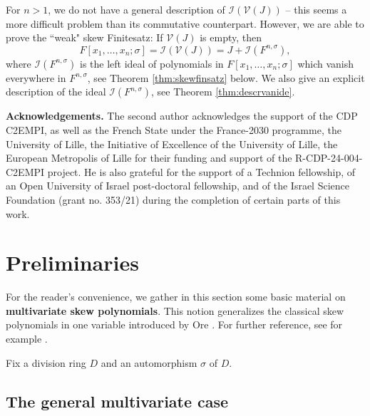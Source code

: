 \documentclass[11pt,reqno]{amsart}
\theoremstyle{definition}
\begin{document}
For $n > 1$, we do not have a general description of $\mathscr{I}(\mathscr{V}(J))$ -- this seems a more difficult problem than its commutative counterpart. However, we are able to prove the ``weak" skew Finitesatz: If $\mathscr{V}(J)$ is empty, then $$F[x_1,\dots,x_n;\sigma]=\mathscr{I}(\mathscr{V}(J))=J+\mathscr{I}(F^{n,\sigma}),$$
where $\mathscr{I}(F^{n,\sigma})$ is the left ideal of polynomials in $F[x_1,\ldots,x_n;\sigma]$ which vanish everywhere in $F^{n,\sigma}$, see Theorem \ref{thm:skewfinsatz} below. We also give an explicit description of the ideal $\mathscr{I}(F^{n,\sigma})$, see Theorem \ref{thm:descrvanide}. 


{\bf Acknowledgements.} The second author acknowledges the support of the CDP C2EMPI, as well as the French State under the France-2030 programme, the University of Lille, the Initiative of Excellence of the University of Lille, the European Metropolis of Lille for their funding and support of the R-CDP-24-004-C2EMPI project. He is also grateful for the support of a Technion fellowship, of an Open University of
Israel post-doctoral fellowship, and of the Israel Science Foundation (grant no. 353/21) during the completion of certain parts of this work.

\section{Preliminaries}\label{sec:prelim}

For the reader's convenience, we gather in this section some basic material on {\bf multivariate skew polynomials}. This notion generalizes the classical skew polynomials in one variable introduced by Ore \cite{Ore33}. For further reference, see for example \cite{Vos86}. 

Fix a division ring $D$ and an automorphism $\sigma$ of $D$. 

\subsection{The general multivariate case}\label{subsec:multi_variate}
\end{document}
